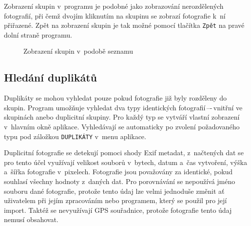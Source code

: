 Zobrazení skupin v~programu je podobné jako zobrazování nerozdělených fotografií, při čemž dvojím kliknutím na skupinu se zobrazí fotografie k~ní přiřazené. Zpět na zobrazení skupin je tak možné pomocí tlačítka \texttt{Zpět} na pravé dolní straně programu.

\begin{figure}[h]
\begin{center}
\caption{Zobrazení skupin v~podobě seznamu}
\label{SK_S}
\end{center}
\end{figure}

\subsection*{Hledání duplikátů}
Duplikáty se mohou vyhledat pouze pokud fotografie již byly rozděleny do skupin. Program umožňuje vyhledat dva typy identických fotografií\,–-\,vnitřní ve skupinách anebo duplicitní skupiny. Pro každý typ se vytváří vlastní zobrazení v~hlavním okně aplikace. Vyhledávají se automaticky po zvolení požadovaného typu pod záložkou \texttt{DUPLIKÁTY} v~menu aplikace.

Duplicitní fotografie se detekují pomoci shody Exif metadat, z~načtených dat se pro tento účel využívají velikost souborů v~bytech, datum a~čas vytvoření, výška a~šířka fotografie v~pixelech. Fotografie jsou považovány za identické, pokud souhlasí všechny hodnoty z~daných dat. Pro porovnávání se nepoužívá jméno souboru dané fotografie, protože tento údaj lze velmi jednoduše změnit ať uživatelem při jejím zpracováním nebo programem, který se použil pro její import. Taktéž se nevyužívají GPS souřadnice, protože fotografie tento údaj nemusí obsahovat.

